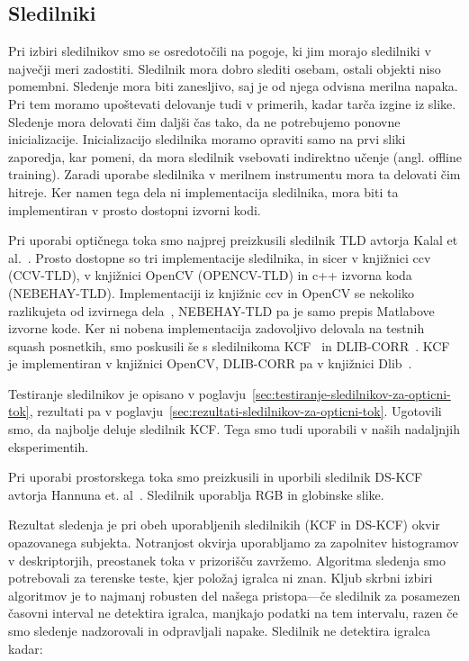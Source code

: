 \subsection{Sledilniki}
Pri izbiri sledilnikov smo se osredotočili na pogoje, ki jim morajo sledilniki v največji meri zadostiti. Sledilnik mora dobro slediti osebam, ostali objekti niso pomembni. Sledenje mora biti zanesljivo, saj je od njega odvisna merilna napaka. Pri tem moramo upoštevati delovanje tudi v primerih, kadar tarča izgine iz slike. Sledenje mora delovati čim daljši čas tako, da ne potrebujemo ponovne inicializacije. Inicializacijo sledilnika moramo opraviti samo na prvi sliki zaporedja, kar pomeni, da mora sledilnik vsebovati indirektno učenje (angl. offline training). Zaradi uporabe sledilnika v merilnem instrumentu mora ta delovati čim hitreje. Ker namen tega dela ni implementacija sledilnika, mora biti ta implementiran v prosto dostopni izvorni kodi. 

Pri uporabi optičnega toka smo najprej preizkusili sledilnik TLD avtorja Kalal et al.~\cite{kalal2012tracking}. Prosto dostopne so tri implementacije sledilnika, in sicer v knjižnici ccv (CCV-TLD), v knjižnici OpenCV (OPENCV-TLD) in c++ izvorna koda (NEBEHAY-TLD). Implementaciji iz knjižnic ccv in OpenCV se nekoliko razlikujeta od izvirnega dela~\cite{kalal2012tracking}, NEBEHAY-TLD pa je samo prepis Matlabove izvorne kode.  Ker ni nobena implementacija zadovoljivo delovala na testnih squash posnetkih, smo poskusili še s sledilnikoma KCF~\cite{danelljan2014adaptive} in DLIB-CORR~\cite{danelljan2014accurate}. KCF je implementiran v knjižnici OpenCV, DLIB-CORR pa v knjižnici Dlib~\cite{king2009dlib}.

Testiranje sledilnikov je opisano v poglavju~\ref{sec:testiranje-sledilnikov-za-opticni-tok}, rezultati pa v poglavju~\ref{sec:rezultati-sledilnikov-za-opticni-tok}. Ugotovili smo, da najbolje deluje sledilnik KCF. Tega smo tudi uporabili v naših nadaljnjih eksperimentih.

Pri uporabi prostorskega toka smo preizkusili in uporbili sledilnik DS-KCF avtorja Hannuna et. al~\cite{hannuna2016ds}. Sledilnik uporablja RGB in globinske slike.


Rezultat sledenja je pri obeh uporabljenih sledilnikih (KCF in DS-KCF) okvir opazovanega subjekta. Notranjost okvirja uporabljamo za zapolnitev histogramov v deskriptorjih, preostanek toka v prizorišču zavržemo. Algoritma sledenja smo potrebovali za terenske teste, kjer položaj igralca ni znan. Kljub skrbni izbiri algoritmov je to najmanj robusten del našega pristopa---če sledilnik za posamezen časovni interval ne detektira igralca, manjkajo podatki na tem intervalu, razen če smo sledenje nadzorovali in odpravljali napake. Sledilnik ne detektira igralca kadar:

